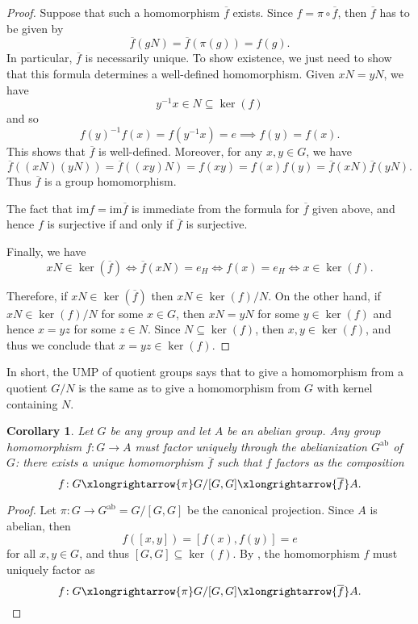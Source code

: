 \documentclass[12pt]{report}
\newtheorem{corollary}[theorem]{Corollary}
\numberwithin{equation}{section}
\numberwithin{theorem}{chapter}
\theoremstyle{definition}
\newtheorem*{basic properties}{Basic Properties}
\newtheorem*{Important Remark}{Important Remark}
\renewcommand{\ker}{\operatorname{ker}}
\begin{document}
\begin{proof}
Suppose that such a homomorphism $\overline{f}$ exists. 
Since $f=\pi\circ \overline f$, then $\overline{f}$ has to be given by 
$$\overline{f}(gN) = \overline{f}(\pi(g)) = f(g).$$
In particular, $\overline f$ is necessarily unique. To show existence, we just need to show that this formula determines a well-defined homomorphism. Given $xN = yN$, we have
$$y^{-1}x \in N \subseteq \ker(f)$$ 
and so 
$$f(y)^{-1} f(x) = f(y^{-1}x) = e \implies f(y) = f(x).$$ 
This shows that $\overline{f}$ is well-defined. Moreover, for any $x,y \in G$, we have
$$\overline{f}((xN)(yN)) = \overline{f}((xy)N) = f(xy) = f(x)f(y) =\overline{f}(xN) \overline{f}(yN).$$
Thus $\overline{f}$ is a group homomorphism.

The fact that $\mathrm{im} f=\mathrm{im} \overline f$ is immediate from the formula for $\overline f$ given above, and hence $f$ is surjective if and only if $\overline f$ is surjective.

Finally, we have 
$$xN \in \ker (\overline{f}) \iff \overline{f}(xN) = e_H \iff f(x) = e_H \iff x \in \ker(f).$$ 

Therefore, if $xN \in \ker (\overline{f})$ then $xN \in  \ker(f)/N$.
On the other hand, if $xN \in \ker(f)/N$ for some $x \in G$, then $xN = yN$ for some $y \in \ker(f)$ and hence $x = yz$ for some $z \in N$. Since $N \subseteq \ker(f)$, then $x, y \in \ker(f)$, and thus we conclude that $x = yz \in \ker(f)$.
\end{proof}


In short, the UMP of quotient groups says that to give a homomorphism from a quotient $G/N$ is the same as to give a homomorphism from $G$ with kernel containing $N$.



\begin{corollary}
Let $G$ be any group and let $A$ be an abelian group.
Any group homomorphism $f\!: G \to A$ must factor uniquely through the abelianization $G^{\textrm{ab}}$ of $G$: there exists a unique homomorphism $\overline{f}$ such that $f$ factors as the composition
$$f\!:G \xlongrightarrow{\pi} G/[G,G] \xlongrightarrow{\overline{f}} A.$$
\end{corollary}

\begin{proof}
	Let $\pi\!: G \to G^\textrm{ab} = G/[G,G]$ be the canonical projection. Since $A$ is abelian, then
$$f([x,y]) = [f(x),f(y)] = e$$ 
for all $x, y \in G$, and thus $[G,G] \subseteq \ker(f)$.
By , the homomorphism $f$ must uniquely factor as
$$f\!:G \xlongrightarrow{\pi} G/[G,G] \xlongrightarrow{\overline{f}} A.\qedhere$$
\end{proof}
\end{document}
